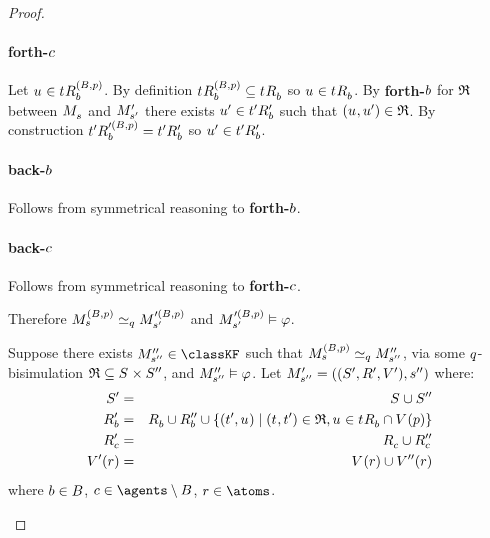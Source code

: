 \begin{proof}
\begin{description}
        \paragraph{forth-$\agentC$}
        Let $\kStateU \in \kSuccessorsB[(\agentsB, \atomP)]{\kStateT}$.
        By definition $\kSuccessorsB[(\agentsB, \atomP)]{\kStateT} \subseteq \kSuccessorsB{\kStateT}$ so $\kStateU \in \kSuccessorsB{\kStateT}$.
        By {\bf forth-$\agentB$} for $\bisimulation$ between $\kPModel{\kStateS}$ and $\kPModelP{\kStateSP}$ there exists $\kStateUP \in \kSuccessorsPB{\kStateTP}$ such that $(\kStateU, \kStateUP) \in \bisimulation$.
        By construction $\kSuccessorsB[\prime(\agentsB, \atomP)]{\kStateTP} = \kSuccessorsPB{\kStateTP}$ so $\kStateUP \in \kSuccessorsPB{\kStateTP}$.

        \paragraph{back-$\agentB$}
        Follows from symmetrical reasoning to {\bf forth-$\agentB$}.

        \paragraph{back-$\agentC$}
        Follows from symmetrical reasoning to {\bf forth-$\agentC$}.

        Therefore $\kPModel[(\agentsB, \atomP)]{\kStateS} \bisimilar[\atomQ] \kPModel[\prime(\agentsB, \atomP)]{\kStateSP}$ and $\kPModel[\prime(\agentsB, \atomP)]{\kStateSP} \entails \phi$.

        Suppose there exists $\kPModelPP{\kStateSPP} \in \classKF$ such that $\kPModel[(\agentsB, \atomP)]{\kStateS} \bisimilar[\atomQ] \kPModelPP{\kStateSPP}$, via some $\atomQ$-bisimulation $\bisimulation \subseteq \kStates \times \kStatesPP$, and $\kPModelPP{\kStateSPP} \entails \phi$.
        Let $\kPModelAndTupleP{\kStateSPP}$ where:
        \begin{eqnarray*}
            \kStatesP &=& \kStates \cup \kStatesPP\\
            \kAccessibilityPB &=& \kAccessibilityB \cup \kAccessibilityPPB \cup \{(\kStateTP, \kStateU) \mid (\kStateT, \kStateTP) \in \bisimulation, \kStateU \in \kSuccessorsB{\kStateT} \cap \kValuation(\atomP)\}\\
            \kAccessibilityPC &=& \kAccessibilityC \cup \kAccessibilityPPC\\
            \kValuationP(\atomR) &=& \kValuation(\atomR) \cup \kValuationPP(\atomR)
        \end{eqnarray*}
        where $\agentB \in \agentsB$, $\agentC \in \agents \setminus \agentsB$, $\atomR \in \atoms$.


\end{description}
\end{proof}
